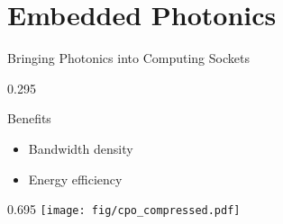 
\section{Embedded Photonics}

\begin{frame}{Bringing Photonics into Computing Sockets}

    \lrlSideBySide%
    {0.295}{%
        \begin{block}{Benefits}
            \begin{itemize}
                \item Bandwidth density
                \item Energy efficiency
            \end{itemize}
        \end{block}
        \vspace{1em}
    }%
    {0.695}{%
        \texttt{[image: fig/cpo\_compressed.pdf]}%
    }

\end{frame}